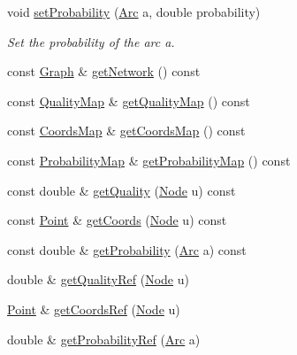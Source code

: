 \begin{DoxyCompactItemize}
void \hyperlink{class_landscape_abf8fb4b7e4185c9f876aa3afc39d1331}{set\+Probability} (\hyperlink{classconcepts_1_1_abstract_landscape_a0966623f028fe50ac9a3ae114dcf2672}{Arc} a, double probability)
\begin{DoxyCompactList}\small\item\em Set the probability of the arc a. \end{DoxyCompactList}\item 
const \hyperlink{classconcepts_1_1_abstract_landscape_ab1988ca4ff36329c45af21e76046903d}{Graph} \& \hyperlink{class_landscape_a5f372f74530914d9128a036bbdaf7800}{get\+Network} () const
\item 
const \hyperlink{classconcepts_1_1_abstract_landscape_aab540b896ac9b7a7a5783f2a78f304ad}{Quality\+Map} \& \hyperlink{class_landscape_a77f947fdc6a8c8875d7d383eb5ce7817}{get\+Quality\+Map} () const
\item 
const \hyperlink{classconcepts_1_1_abstract_landscape_a8432d7dff7edc5a5cbc524592b411f8a}{Coords\+Map} \& \hyperlink{class_landscape_ab6e4efb27be3f1870ce42656a5534d68}{get\+Coords\+Map} () const
\item 
const \hyperlink{classconcepts_1_1_abstract_landscape_ae90ffb759facff21b29e646539352182}{Probability\+Map} \& \hyperlink{class_landscape_a771053b32bbcb6a3fa5204b8bdb53a6d}{get\+Probability\+Map} () const
\item 
const double \& \hyperlink{class_landscape_a15c6c9bf708e4ceb3a9118157f99659a}{get\+Quality} (\hyperlink{classconcepts_1_1_abstract_landscape_a7c2f90fb9f42302f1af84a59f4df4b91}{Node} u) const
\item 
const \hyperlink{abstract__landscape_8hpp_a9c14bcba65b035519a9c98f1eb1babbe}{Point} \& \hyperlink{class_landscape_a99f206e722c06b938fe1f2e105de310d}{get\+Coords} (\hyperlink{classconcepts_1_1_abstract_landscape_a7c2f90fb9f42302f1af84a59f4df4b91}{Node} u) const
\item 
const double \& \hyperlink{class_landscape_ac251ee7350a51502a1006333894082c3}{get\+Probability} (\hyperlink{classconcepts_1_1_abstract_landscape_a0966623f028fe50ac9a3ae114dcf2672}{Arc} a) const
\item 
double \& \hyperlink{class_landscape_af6fdabb5a81dc4cf75d7baaf6d98ee31}{get\+Quality\+Ref} (\hyperlink{classconcepts_1_1_abstract_landscape_a7c2f90fb9f42302f1af84a59f4df4b91}{Node} u)
\item 
\hyperlink{abstract__landscape_8hpp_a9c14bcba65b035519a9c98f1eb1babbe}{Point} \& \hyperlink{class_landscape_a5c7fb81e36d91b0300815962e1677d5e}{get\+Coords\+Ref} (\hyperlink{classconcepts_1_1_abstract_landscape_a7c2f90fb9f42302f1af84a59f4df4b91}{Node} u)
\item 
double \& \hyperlink{class_landscape_a1d8000badf88704d19ce276743e67a25}{get\+Probability\+Ref} (\hyperlink{classconcepts_1_1_abstract_landscape_a0966623f028fe50ac9a3ae114dcf2672}{Arc} a)
\end{DoxyCompactItemize}
